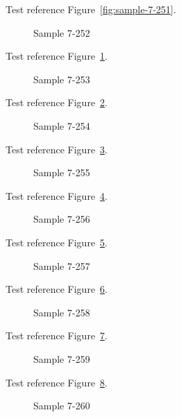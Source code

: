Test reference Figure~\ref{fig:sample-7-251}.

\begin{figure}[tbhp]
\caption{Sample 7-252}
\label{fig:sample-7-252}
\end{figure}

Test reference Figure~\ref{fig:sample-7-252}.

\begin{figure}[tbhp]
\caption{Sample 7-253}
\label{fig:sample-7-253}
\end{figure}

Test reference Figure~\ref{fig:sample-7-253}.

\begin{figure}[tbhp]
\caption{Sample 7-254}
\label{fig:sample-7-254}
\end{figure}

Test reference Figure~\ref{fig:sample-7-254}.

\begin{figure}[tbhp]
\caption{Sample 7-255}
\label{fig:sample-7-255}
\end{figure}

Test reference Figure~\ref{fig:sample-7-255}.

\begin{figure}[tbhp]
\caption{Sample 7-256}
\label{fig:sample-7-256}
\end{figure}

Test reference Figure~\ref{fig:sample-7-256}.

\begin{figure}[tbhp]
\caption{Sample 7-257}
\label{fig:sample-7-257}
\end{figure}

Test reference Figure~\ref{fig:sample-7-257}.

\begin{figure}[tbhp]
\caption{Sample 7-258}
\label{fig:sample-7-258}
\end{figure}

Test reference Figure~\ref{fig:sample-7-258}.

\begin{figure}[tbhp]
\caption{Sample 7-259}
\label{fig:sample-7-259}
\end{figure}

Test reference Figure~\ref{fig:sample-7-259}.

\begin{figure}[tbhp]
\caption{Sample 7-260}
\label{fig:sample-7-260}
\end{figure}


